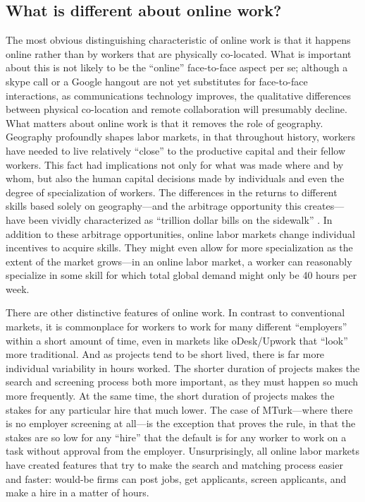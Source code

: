 \documentclass[11pt]{article}
\begin{document}
\subsection{What is different about online work?}

The most obvious distinguishing characteristic of online work is that it happens online rather than by workers that are physically co-located. 
What is important about this is not likely to be the ``online'' face-to-face aspect per se; 
although a skype call or a Google hangout are not yet substitutes for face-to-face interactions, as communications technology improves, the qualitative differences between physical co-location and remote collaboration will presumably decline.
What matters about online work is that it removes the role of geography. 
Geography profoundly shapes labor markets, in that throughout history, workers have needed to live relatively ``close'' to the productive capital and their fellow workers.
This fact had implications not only for what was made where and by whom, but also the human capital decisions made by individuals and even the degree of specialization of workers. 
The differences in the returns to different skills based solely on geography---and the arbitrage opportunity this creates---have been vividly characterized as ``trillion dollar bills on the sidewalk'' \cite{clemens2011economics}.
In addition to these arbitrage opportunities, online labor markets change individual incentives to acquire skills.
They might even allow for more specialization as the extent of the market grows---in an online labor market, a worker can reasonably specialize in some skill for which total global demand might only be 40 hours per week. 

There are other distinctive features of online work.
In contrast to conventional markets, it is commonplace for workers to work for many different ``employers'' within a short amount of time, even in markets like oDesk/Upwork that ``look'' more traditional. 
And as projects tend to be short lived, there is far more individual variability in hours worked.
The shorter duration of projects makes the search and screening process both more important, as they must happen so much more frequently.  
At the same time, the short duration of projects makes the stakes for any particular hire that much lower.
The case of MTurk---where there is no employer screening at all---is the exception that proves the rule, in that the stakes are so low for any ``hire'' that the default is for any worker to work on a task without approval from the employer. 
Unsurprisingly, all online labor markets have created features that try to make the search and matching process easier and faster: 
would-be firms can post jobs, get applicants, screen applicants, and make a hire in a matter of hours.
\end{document}
